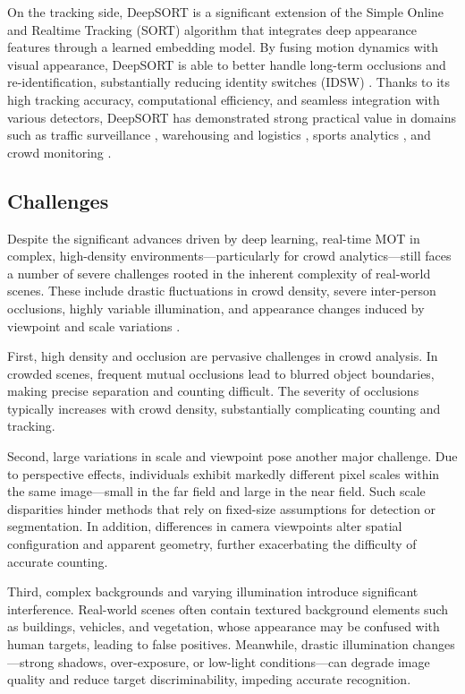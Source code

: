 On the tracking side, DeepSORT is a significant extension of the Simple Online and Realtime Tracking (SORT) algorithm that integrates deep appearance features through a learned embedding model. By fusing motion dynamics with visual appearance, DeepSORT is able to better handle long-term occlusions and re-identification, substantially reducing identity switches (IDSW) \cite{211}. Thanks to its high tracking accuracy, computational efficiency, and seamless integration with various detectors, DeepSORT has demonstrated strong practical value in domains such as traffic surveillance \cite{138}, warehousing and logistics \cite{212}, sports analytics \cite{213}, and crowd monitoring \cite{120}.

\subsection{Challenges}
Despite the significant advances driven by deep learning, real-time MOT in complex, high-density environments—particularly for crowd analytics—still faces a number of severe challenges rooted in the inherent complexity of real-world scenes. These include drastic fluctuations in crowd density, severe inter-person occlusions, highly variable illumination, and appearance changes induced by viewpoint and scale variations \cite{30_khan_passenger_2020,01_noauthor_deep_2024,66_zhang_bus_2020}.

First, high density and occlusion are pervasive challenges in crowd analysis. In crowded scenes, frequent mutual occlusions lead to blurred object boundaries, making precise separation and counting difficult. The severity of occlusions typically increases with crowd density, substantially complicating counting and tracking\cite{33or34_li_lightweight_2023}\cite{30_khan_passenger_2020}\cite{01_noauthor_deep_2024}.

Second, large variations in scale and viewpoint pose another major challenge. Due to perspective effects, individuals exhibit markedly different pixel scales within the same image—small in the far field and large in the near field. Such scale disparities hinder methods that rely on fixed-size assumptions for detection or segmentation. In addition, differences in camera viewpoints alter spatial configuration and apparent geometry, further exacerbating the difficulty of accurate counting\cite{29_kaur_systematic_2024}\cite{30_khan_passenger_2020}.

Third, complex backgrounds and varying illumination introduce significant interference. Real-world scenes often contain textured background elements such as buildings, vehicles, and vegetation, whose appearance may be confused with human targets, leading to false positives. Meanwhile, drastic illumination changes—strong shadows, over-exposure, or low-light conditions—can degrade image quality and reduce target discriminability, impeding accurate recognition\cite{33or34_li_lightweight_2023}\cite{30_khan_passenger_2020}.

